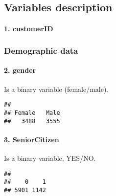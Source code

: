 \documentclass[
]{article}
\newenvironment{Shaded}{\begin{snugshade}}{\end{snugshade}}
\newcommand{\FunctionTok}[1]{\textcolor[rgb]{0.00,0.00,0.00}{#1}}
\newcommand{\NormalTok}[1]{#1}
\newcommand{\SpecialCharTok}[1]{\textcolor[rgb]{0.00,0.00,0.00}{#1}}
\begin{document}
\hypertarget{variables-description}{%
\subsection{Variables description}\label{variables-description}}

\hypertarget{customerid}{%
\paragraph{1. customerID}\label{customerid}}

\hypertarget{demographic-data}{%
\subsubsection{Demographic data}\label{demographic-data}}

\hypertarget{gender}{%
\paragraph{2. gender}\label{gender}}

Is a binary variable (female/male).

\begin{Shaded}
\end{Shaded}

\begin{verbatim}
## 
## Female   Male 
##   3488   3555
\end{verbatim}

\hypertarget{seniorcitizen}{%
\paragraph{3. SeniorCitizen}\label{seniorcitizen}}

Is a binary variable, YES/NO.

\begin{Shaded}
\end{Shaded}

\begin{verbatim}
## 
##    0    1 
## 5901 1142
\end{verbatim}
\end{document}
